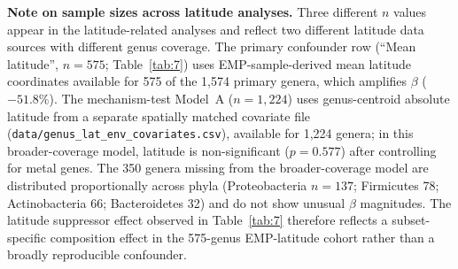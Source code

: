 \documentclass[times]{zHenriquesLab-StyleBioRxiv}
\begin{document}
\textbf{Note on sample sizes across latitude analyses.} Three different $n$
values appear in the latitude-related analyses and reflect two different
latitude data sources with different genus coverage. The primary confounder
row (``Mean latitude'', $n = 575$; Table~\ref{tab:7}) uses EMP-sample-derived
mean latitude coordinates available for 575 of the 1,574 primary genera, which
amplifies $\beta$ ($-51.8\%$). The mechanism-test Model~A ($n = 1{,}224$) uses
genus-centroid absolute latitude from a separate spatially matched covariate
file (\texttt{data/genus\_lat\_env\_covariates.csv}), available for 1,224 genera;
in this broader-coverage model, latitude is non-significant ($p = 0.577$) after
controlling for metal genes. The 350 genera missing from the broader-coverage
model are distributed proportionally across phyla (Proteobacteria $n = 137$;
Firmicutes 78; Actinobacteria 66; Bacteroidetes 32) and do not show unusual
$\beta$ magnitudes. The latitude suppressor effect observed in Table~\ref{tab:7}
therefore reflects a subset-specific composition effect in the 575-genus
EMP-latitude cohort rather than a broadly reproducible confounder.
\end{document}
